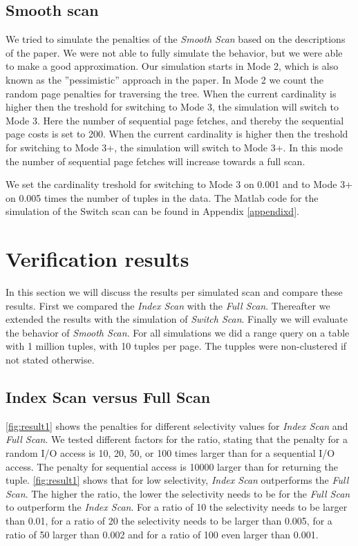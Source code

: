 \documentclass[a4paper,11pt,twoside]{article}
\begin{document}
\subsection{Smooth scan}
We tried to simulate the penalties of the \textit{Smooth Scan} based on the descriptions of the paper. We were not able to fully simulate the behavior, but we were able to make a good approximation. Our simulation starts in Mode 2, which is also known as the ''pessimistic'' approach in the paper. In Mode 2 we count the random page penalties for traversing the tree. When the current cardinality is higher then the treshold for switching to Mode 3, the simulation will switch to Mode 3. Here the number of sequential page fetches, and thereby the sequential page costs is set to 200. When the current cardinality is higher then the  treshold for switching to Mode 3+, the simulation will switch to Mode 3+. In this mode the number of sequential page fetches will increase towards a full scan.

We set the cardinality treshold for switching to Mode 3 on 0.001 and to Mode 3+ on 0.005 times the number of tuples in the data. The Matlab code for the simulation of the Switch scan can be found in Appendix \ref{appendixd}.


\section{Verification results}
In this section we will discuss the results per simulated scan and compare these results. First we compared the \textit{Index Scan} with the \textit{Full Scan}. Thereafter we extended the results with the simulation of \textit{Switch Scan}. Finally we will evaluate the behavior of \textit{Smooth Scan}. For all simulations  we did a range query on a table with 1 million tuples, with 10 tuples per page. The tupples were non-clustered if not stated otherwise. \\

\subsection{Index Scan versus Full Scan}
\autoref{fig:result1} shows the penalties for different selectivity values for \textit{Index Scan} and \textit{Full Scan}. We tested different factors for the ratio, stating that the penalty for a random I/O access is 10, 20, 50, or 100 times larger than for a sequential I/O access. The penalty for sequential access is 10000 larger than for returning the tuple. \autoref{fig:result1} shows that for low selectivity, \textit{Index Scan} outperforms the \textit{Full Scan}. The higher the ratio, the lower the selectivity needs to be for the \textit{Full Scan} to outperform the \textit{Index Scan}. For a ratio of 10 the selectivity needs to be larger than 0.01, for a ratio of 20 the selectivity needs to be larger than  0.005, for a ratio of 50 larger than 0.002 and for a ratio of 100 even larger than 0.001.
\end{document}
